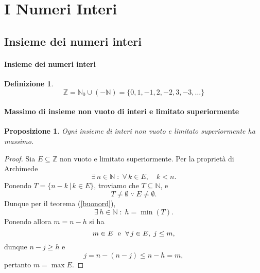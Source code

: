 \documentclass{article}
\theoremstyle{plain}
\newtheorem{prop}[thm]{Proposizione}
\theoremstyle{definition}
\newtheorem{defn}{Definizione}[section]
\theoremstyle{remark}
\begin{document}
\vspace{50pt}
\section{I Numeri Interi}
\vspace{50pt}

\subsection{Insieme dei numeri interi}

\vspace{10pt}

\paragraph{Insieme dei numeri interi}
\begin{bxthm}
\begin{defn}
    \[\mathbb{Z}=\mathbb{N}_0\cup(-\mathbb{N})=\{0,1,-1,2,-2,3,-3,\dots\}\]    
\end{defn}
\end{bxthm}

\vspace{10pt}

\paragraph{Massimo di insieme non vuoto di interi e limitato superiormente}
\begin{bxthm}
\begin{prop}
    Ogni insieme di interi non vuoto e limitato superiormente ha massimo.
\end{prop}
\end{bxthm}
\begin{proof}
    Sia $E\subseteq\mathbb{Z}$ non vuoto e limitato superiormente.
    Per la proprietà di Archimede \[\exists\, n\in\mathbb{N}\;:\;\forall\, k\in E,\quad k<n.\]
    Ponendo $T=\{n-k\,|\,k\in E\}$, troviamo che $T\subseteq\mathbb{N}$, e
    \[T\neq \emptyset \;\because\; E\neq\emptyset.\] 
    Dunque per il teorema (\ref{buonord}), \[\exists\, h\in\mathbb{N}\;:\;h=\min(T).\]
    Ponendo allora $m=n-h$ si ha \[m\in E\;\textup{ e }\;\forall\, j\in E,\;j\leq m,\]
    dunque $n-j\geq h$ e \[j=n-(n-j)\leq n-h=m,\]
    pertanto $m=\max E$.
\end{proof}

\vspace{10pt}
\end{document}
